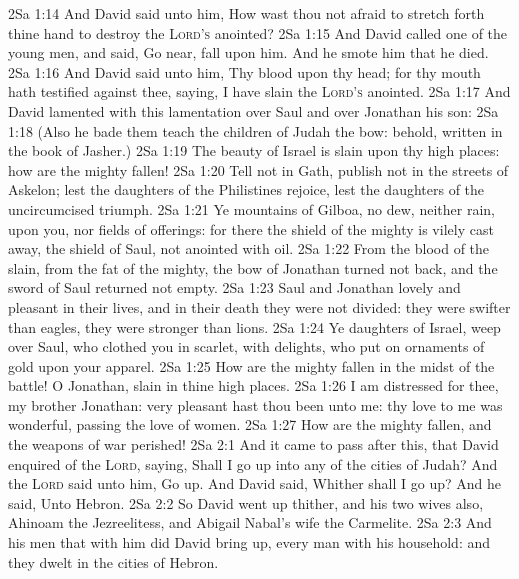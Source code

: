 \vs 2Sa 1:14 And David said unto him, How wast thou not afraid to stretch forth thine hand to destroy the \textsc{Lord's} anointed?
\vs 2Sa 1:15 And David called one of the young men, and said, Go near,  fall upon him. And he smote him that he died.
\vs 2Sa 1:16 And David said unto him, Thy blood  upon thy head; for thy mouth hath testified against thee, saying, I have slain the \textsc{Lord's} anointed.
\vs 2Sa 1:17 And David lamented with this lamentation over Saul and over Jonathan his son:
\vs 2Sa 1:18 (Also he bade them teach the children of Judah  the bow: behold,  written in the book of Jasher.)
\vs 2Sa 1:19 The beauty of Israel is slain upon thy high places: how are the mighty fallen!
\vs 2Sa 1:20 Tell  not in Gath, publish  not in the streets of Askelon; lest the daughters of the Philistines rejoice, lest the daughters of the uncircumcised triumph.
\vs 2Sa 1:21 Ye mountains of Gilboa,  no dew, neither  rain, upon you, nor fields of offerings: for there the shield of the mighty is vilely cast away, the shield of Saul,  not  anointed with oil.
\vs 2Sa 1:22 From the blood of the slain, from the fat of the mighty, the bow of Jonathan turned not back, and the sword of Saul returned not empty.
\vs 2Sa 1:23 Saul and Jonathan  lovely and pleasant in their lives, and in their death they were not divided: they were swifter than eagles, they were stronger than lions.
\vs 2Sa 1:24 Ye daughters of Israel, weep over Saul, who clothed you in scarlet, with  delights, who put on ornaments of gold upon your apparel.
\vs 2Sa 1:25 How are the mighty fallen in the midst of the battle! O Jonathan,  slain in thine high places.
\vs 2Sa 1:26 I am distressed for thee, my brother Jonathan: very pleasant hast thou been unto me: thy love to me was wonderful, passing the love of women.
\vs 2Sa 1:27 How are the mighty fallen, and the weapons of war perished!
\vs 2Sa 2:1 And it came to pass after this, that David enquired of the \textsc{Lord}, saying, Shall I go up into any of the cities of Judah? And the \textsc{Lord} said unto him, Go up. And David said, Whither shall I go up? And he said, Unto Hebron.
\vs 2Sa 2:2 So David went up thither, and his two wives also, Ahinoam the Jezreelitess, and Abigail Nabal's wife the Carmelite.
\vs 2Sa 2:3 And his men that  with him did David bring up, every man with his household: and they dwelt in the cities of Hebron.
